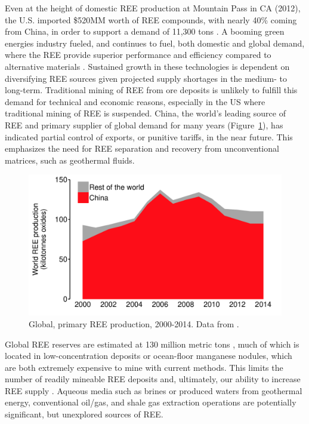Even at the height of domestic REE production at Mountain Pass in CA (2012), the U.S. imported \$520MM worth of REE compounds, with nearly 40\% coming from China, in order to support a demand of 11,300 tons \citep{USGS_minyb_2012}.
A booming green energies industry fueled, and continues to fuel, both domestic and global demand, where the REE provide superior performance and efficiency compared to alternative materials \citep{Nassar_JIE_2015, Graedel_PNAS_2015}.
Sustained growth in these technologies is dependent on diversifying REE sources given projected supply shortages in the medium- to long-term.
Traditional mining of REE from ore deposits is unlikely to fulfill this demand for technical and economic reasons, especially in the US where traditional mining of REE is suspended.
China, the world's leading source of REE and primary supplier of global demand for many years (Figure~\ref{fig:world-REO-prod}), has indicated partial control of exports, or punitive tariffs, in the near future.
This emphasizes the need for REE separation and recovery from unconventional matrices, such as geothermal fluids.

\begin{figure}[htbp]
\begin{center}
\includegraphics[width = \textwidth]{Ch1_figures/World-REO-production.pdf}
\caption[Global, primary REE production, 2000-2014.]{Global, primary REE production, 2000-2014.
Data from \citet{USGS_commsumm}.}\label{fig:world-REO-prod}
\end{center}
\end{figure}

Global REE reserves are estimated at 130 million metric tons \citep{USGS_commsumm}, much of which is located in low-concentration deposits or ocean-floor manganese nodules, which are both extremely expensive to mine with current methods.
This limits the number of readily mineable REE deposits and, ultimately, our ability to increase REE supply \citep{JRC_2011, Alonso_EST_2012}.
Aqueous media such as brines or produced waters from geothermal energy, conventional oil/gas, and shale gas extraction operations are potentially significant, but unexplored sources of REE.

